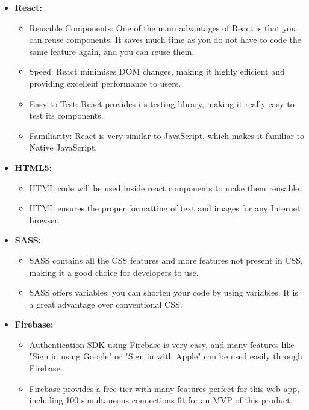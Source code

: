 \begin{itemize}
    \item \textbf{React:} \parencite{Reference20}
    \begin{itemize}
        \item Reusable Components: One of the main advantages of React is that you can reuse components. It saves much time as you do not have to code the same feature again, and you can reuse them.
        \item Speed: React minimises DOM changes, making it highly efficient and providing excellent performance to users.
        \item Easy to Test: React provides its testing library, making it really easy to test its components.
        \item Familiarity: React is very similar to JavaScript, which makes it familiar to Native JavaScript.
    \end{itemize}
    \item \textbf{HTML5:} \parencite{Reference21}
    \begin{itemize}
        \item HTML code will be used inside react components to make them reusable.
        \item HTML ensures the proper formatting of text and images for any Internet browser.
    \end{itemize}
    \item \textbf{SASS:} \parencite{Reference22}
    \begin{itemize}
        \item SASS contains all the CSS features and more features not present in CSS, making it a good choice for developers to use.
        \item SASS offers variables; you can shorten your code by using variables. It is a great advantage over conventional CSS.
    \end{itemize}
    \item \textbf{Firebase:} \parencite{Reference24}
    \begin{itemize}
        \item Authentication SDK using Firebase is very easy, and many features like "Sign in using Google" or "Sign in with Apple" can be used easily through Firebase.
        \item Firebase provides a free tier with many features perfect for this web app, including 100 simultaneous connections fit for an MVP of this product.
    \end{itemize}
\end{itemize}

